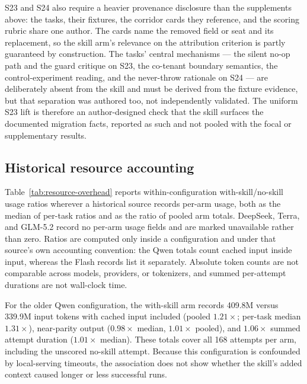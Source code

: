 \documentclass[11pt]{article}
\begin{document}
S23 and S24 also require a heavier provenance disclosure than the supplements above: the tasks, their fixtures, the corridor cards they reference, and the scoring rubric share one author. The cards name the removed field or seat and its replacement, so the skill arm's relevance on the attribution criterion is partly guaranteed by construction. The tasks' central mechanisms --- the silent no-op path and the guard critique on S23, the co-tenant boundary semantics, the control-experiment reading, and the never-throw rationale on S24 --- are deliberately absent from the skill and must be derived from the fixture evidence, but that separation was authored too, not independently validated. The uniform S23 lift is therefore an author-designed check that the skill surfaces the documented migration facts, reported as such and not pooled with the focal or supplementary results.

\subsection{Historical resource accounting}
Table~\ref{tab:resource-overhead} reports within-configuration with-skill/no-skill usage ratios wherever a historical source records per-arm usage, both as the median of per-task ratios and as the ratio of pooled arm totals. DeepSeek, Terra, and GLM-5.2 record no per-arm usage fields and are marked unavailable rather than zero. Ratios are computed only inside a configuration and under that source's own accounting convention: the Qwen totals count cached input inside input, whereas the Flash records list it separately. Absolute token counts are not comparable across models, providers, or tokenizers, and summed per-attempt durations are not wall-clock time.



For the older Qwen configuration, the with-skill arm records 409.8M versus 339.9M input tokens with cached input included (pooled $1.21\times$; per-task median $1.31\times$), near-parity output ($0.98\times$ median, $1.01\times$ pooled), and $1.06\times$ summed attempt duration ($1.01\times$ median). These totals cover all 168 attempts per arm, including the unscored no-skill attempt. Because this configuration is confounded by local-serving timeouts, the association does not show whether the skill's added context caused longer or less successful runs.
\end{document}

